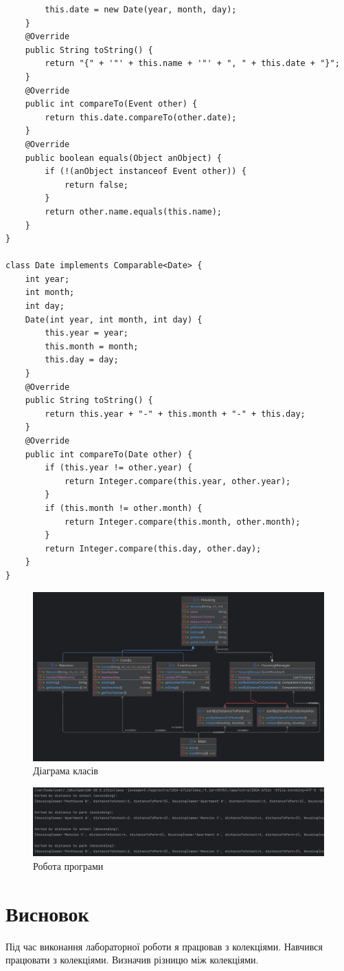 \documentclass[14pt]{extreport}
\begin{document}
\begin{normalsize}
\begin{lstlisting}
		this.date = new Date(year, month, day);
	}
	@Override
	public String toString() {
		return "{" + '"' + this.name + '"' + ", " + this.date + "}";
	}
	@Override
	public int compareTo(Event other) {
		return this.date.compareTo(other.date);
	}
	@Override
	public boolean equals(Object anObject) {
		if (!(anObject instanceof Event other)) {
			return false;
		}
		return other.name.equals(this.name);
	}
}

class Date implements Comparable<Date> {
	int year;
	int month;
	int day;
	Date(int year, int month, int day) {
		this.year = year;
		this.month = month;
		this.day = day;
	}
	@Override
	public String toString() {
		return this.year + "-" + this.month + "-" + this.day;
	}
	@Override
	public int compareTo(Date other) {
		if (this.year != other.year) {
			return Integer.compare(this.year, other.year);
		}
		if (this.month != other.month) {
			return Integer.compare(this.month, other.month);
		}
		return Integer.compare(this.day, other.day);
	}
}
	\end{lstlisting}	
	
	
	\begin{figure}[H]
		\centering
		\includegraphics[scale=0.18]{2}
		\caption{Діаграма класів}
	\end{figure}
	
	\begin{figure}[H]
		\centering
		\includegraphics[scale=0.4]{1}
		\caption{Робота програми}
	\end{figure}

	\section*{Висновок}
	Під час виконання лабораторної роботи я працював з колекціями. Навчився працювати з колекціями. Визначив різницю між колекціями.
	 
\end{normalsize}
\end{document}
